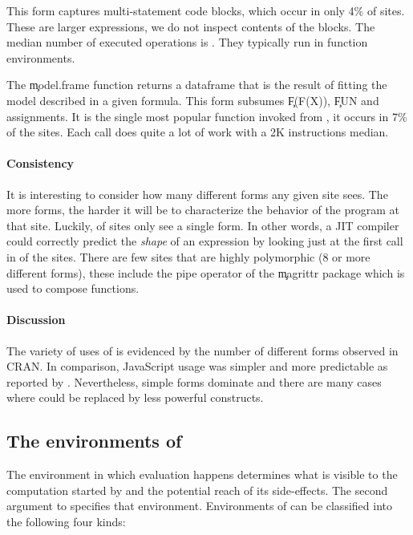 \documentclass[review,screen,acmsmall,anonymous=true]{acmart}
\begin{document}
\medskip\noindent{} This form captures multi-statement
code blocks, which occur in only 4\% of sites. These are larger expressions, we
do not inspect contents of the blocks. The median number of executed operations
is \packageMinimizedmedianoperationsjRnd. They typically run in function
environments.

\medskip\noindent{} The \c{model.frame} function
returns a dataframe that is the result of fitting the model described in a given
formula. This form subsumes \c{F(F(X))}, \c{FUN} and assignments. It is the
single most popular function invoked from \eval, it occurs in 7\% of the sites.
Each call does quite a lot of work with a 2K instructions median.

\paragraph{Consistency} It is interesting to consider how many different
forms any given site sees. The more forms, the harder it will be to characterize
the behavior of the program at that site. Luckily, \packageNbOneMinimizedPercent
of sites only see a single form.  In other words, a JIT compiler could correctly predict the \emph{shape} of an expression by looking just at the first call in \packageNbOneMinimizedPercent of the sites.  There are few sites that are highly polymorphic (8 or more different forms), these include the pipe operator of the \c{magrittr} package which is used to compose functions.

\paragraph{Discussion} The variety of uses of \eval is evidenced by the number
of different forms observed in CRAN. In comparison, JavaScript \eval usage was
simpler and more predictable as reported by \citet{oopsla12b}. Nevertheless,
simple forms dominate and there are many cases where \eval could be replaced
by less powerful constructs.


\subsection{The environments of \eval}\label{sec:env}

The environment in which evaluation happens determines what is visible to the
computation started by \eval and the potential reach of its side-effects. The
second argument to \eval specifies that environment. Environments of \eval can be
classified into the following four kinds:
\end{document}
